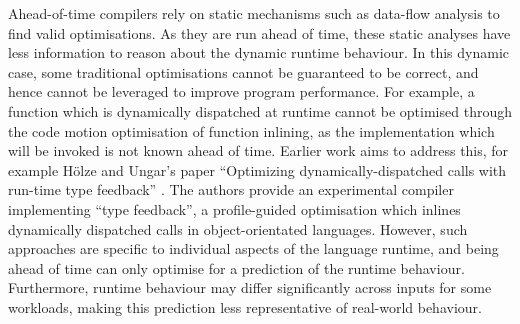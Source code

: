 Ahead-of-time compilers rely on static mechanisms such as data-flow analysis to find valid optimisations.
As they are run ahead of time, these static analyses have less information to reason about the dynamic runtime behaviour. In this dynamic case, some traditional optimisations cannot be guaranteed to be correct, and hence cannot be leveraged to improve program performance. For example, a function which is dynamically dispatched at runtime cannot be optimised through the code motion optimisation of function inlining, as the implementation which will be invoked is not known ahead of time.
Earlier work aims to address this, for example H\"olze and Ungar's paper ``Optimizing dynamically-dispatched calls with run-time type feedback'' \cite{holzleOptimizingDynamicallydispatchedCalls1994}. The authors provide an experimental compiler implementing ``type feedback'', a profile-guided optimisation which inlines dynamically dispatched calls in object-orientated languages.
However, such approaches are specific to individual aspects of the language runtime, and being ahead of time can only optimise for a prediction of the runtime behaviour.
Furthermore, runtime behaviour may differ significantly across inputs for some workloads, making this prediction less representative of real-world behaviour.


